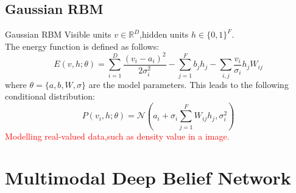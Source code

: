 \documentclass{beamer}
\begin{document}
\begin{CJK*}{UTF8}{gbsn}
\subsection{Gaussian RBM}
\begin{frame}
\begin{block}{Gaussian RBM}
Visible units $v\in \mathbb{R}^D$,hidden units $h\in\{0,1\}^F$.\\
The energy function is defined as follows:
\begin{equation}
E(v,h;\theta)=\sum_{i=1}^D\frac{(v_i-a_i)^2}{2\sigma_i^2}-\sum_{j=1}^Fb_jh_j-\sum_{i,j}\frac{v_i}{\sigma_i}h_jW_{ij}
\end{equation}
where $\theta=\{a,b,W,\sigma\}$ are the model parameters.
This leads to the following conditional distribution:
\begin{equation}
P(v_i,h;\theta)=\mathcal{N}(a_i+\sigma_i\sum_{j=1}^FW_{ij}h_j,\sigma_i^2)
\end{equation}
\textcolor{red}{Modelling real-valued data,such as density value in a image.}
\end{block}
\end{frame}

\section{Multimodal Deep Belief Network}

\end{CJK*}
\end{document}
